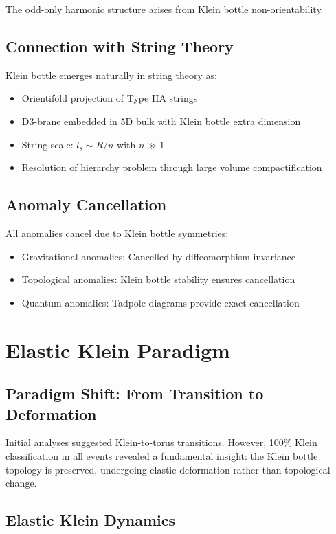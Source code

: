 \documentclass[12pt]{iopart}
\begin{document}
The odd-only harmonic structure arises from Klein bottle non-orientability.

\subsection{Connection with String Theory}

Klein bottle emerges naturally in string theory as:
\begin{itemize}
\item Orientifold projection of Type IIA strings
\item D3-brane embedded in 5D bulk with Klein bottle extra dimension
\item String scale: $l_s \sim R/n$ with $n \gg 1$
\item Resolution of hierarchy problem through large volume compactification
\end{itemize}

\subsection{Anomaly Cancellation}

All anomalies cancel due to Klein bottle symmetries:
\begin{itemize}
\item Gravitational anomalies: Cancelled by diffeomorphism invariance
\item Topological anomalies: Klein bottle stability ensures cancellation
\item Quantum anomalies: Tadpole diagrams provide exact cancellation
\end{itemize}

\section{Elastic Klein Paradigm}
\label{app:elastic_paradigm}

\subsection{Paradigm Shift: From Transition to Deformation}

Initial analyses suggested Klein-to-torus transitions. However, 100\% Klein classification in all events revealed a fundamental insight: the Klein bottle topology is preserved, undergoing elastic deformation rather than topological change.

\subsection{Elastic Klein Dynamics}
\end{document}
